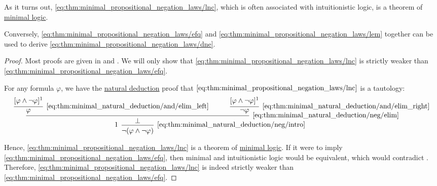 \begin{theorem}
  As it turns out, \eqref{eq:thm:minimal_propositional_negation_laws/lnc}, which is often associated with intuitionistic logic, is a theorem of \hyperref[def:minimal_logic]{minimal logic}.

  Conversely, \eqref{eq:thm:minimal_propositional_negation_laws/efq} and \eqref{eq:thm:minimal_propositional_negation_laws/lem} together can be used to derive \eqref{eq:thm:minimal_propositional_negation_laws/dne}.
\end{theorem}
\begin{proof}
  Most proofs are given in \cite[prop. 3]{DienerMcKubreJordens2016} and \cite[prop. 13]{DienerMcKubreJordens2016}. We will only show that \eqref{eq:thm:minimal_propositional_negation_laws/lnc} is strictly weaker than \eqref{eq:thm:minimal_propositional_negation_laws/efq}.

  For any formula \( \varphi \), we have the \hyperref[thm:minimal_natural_deduction]{natural deduction} proof that \( \eqref{eq:thm:minimal_propositional_negation_laws/lnc} \) is a tautology:
  \begin{equation*}
    \begin{prooftree}[separation=3em]
      \hypo{ [\varphi \wedge \neg \varphi]^1 }
      \infer1[\ref{eq:thm:minimal_natural_deduction/and/elim_left}]{ \varphi }

      \hypo{ [\varphi \wedge \neg \varphi]^1 }
      \infer1[\ref{eq:thm:minimal_natural_deduction/and/elim_right}]{ \neg \varphi }

      \infer2[\ref{eq:thm:minimal_natural_deduction/neg/elim}]{ \bot }

      \infer[left label=\( 1 \)]1[\ref{eq:thm:minimal_natural_deduction/neg/intro}]{ \neg (\varphi \wedge \neg \varphi) }
    \end{prooftree}
  \end{equation*}

  Hence, \eqref{eq:thm:minimal_propositional_negation_laws/lnc} is a theorem of \hyperref[def:minimal_logic]{minimal logic}. If it were to imply \eqref{eq:thm:minimal_propositional_negation_laws/efq}, then minimal and intuitionistic logic would be equivalent, which would contradict \cite[prop. 3]{DienerMcKubreJordens2016}. Therefore, \eqref{eq:thm:minimal_propositional_negation_laws/lnc} is indeed strictly weaker than \eqref{eq:thm:minimal_propositional_negation_laws/efq}.
\end{proof}

\smallskip

